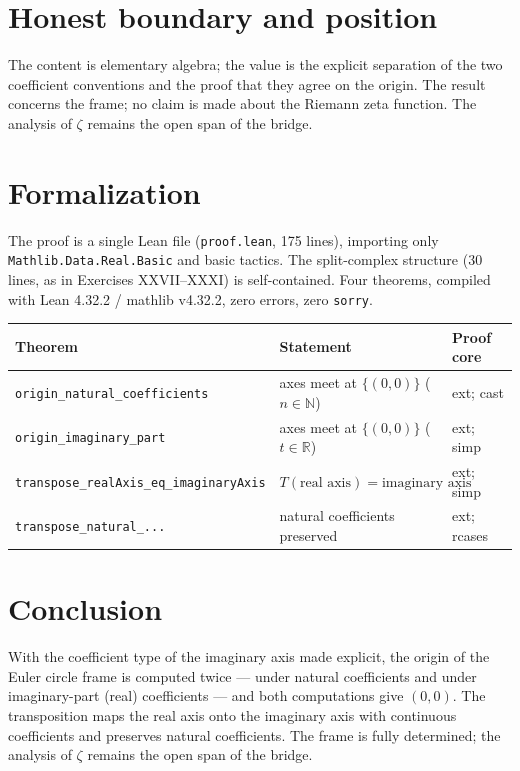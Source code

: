 \documentclass[sigplan,10pt,anonymous,review]{acmart}
\begin{document}
\section{Honest boundary and position}

The content is elementary algebra; the value is the explicit separation
of the two coefficient conventions and the proof that they agree on the
origin. The result concerns the frame; no claim is made about the
Riemann zeta function. The analysis of $\zeta$ remains the open span of
the bridge.

\section{Formalization}

The proof is a single Lean file (\texttt{proof.lean}, 175 lines),
importing only \texttt{Mathlib.Data.Real.Basic} and basic tactics. The
split-complex structure (30 lines, as in Exercises XXVII--XXXI) is
self-contained. Four theorems, compiled with Lean 4.32.2 / mathlib
v4.32.2, zero errors, zero \texttt{sorry}.

\begin{center}
\begin{tabular}{lll}
\toprule
Theorem & Statement & Proof core \\
\midrule
\texttt{origin\_natural\_coefficients} & axes meet at $\{(0,0)\}$ ($n \in \mathbb{N}$) & ext; cast \\
\texttt{origin\_imaginary\_part} & axes meet at $\{(0,0)\}$ ($t \in \mathbb{R}$) & ext; simp \\
\texttt{transpose\_realAxis\_eq\_imaginaryAxis} & $T(\text{real axis}) = \text{imaginary axis}$ & ext; simp \\
\texttt{transpose\_natural\_...} & natural coefficients preserved & ext; rcases \\
\bottomrule
\end{tabular}
\end{center}

\section{Conclusion}

With the coefficient type of the imaginary axis made explicit, the
origin of the Euler circle frame is computed twice --- under natural
coefficients and under imaginary-part (real) coefficients --- and both
computations give $(0,0)$. The transposition maps the real axis onto
the imaginary axis with continuous coefficients and preserves natural
coefficients. The frame is fully determined; the analysis of $\zeta$
remains the open span of the bridge.



\end{document}
